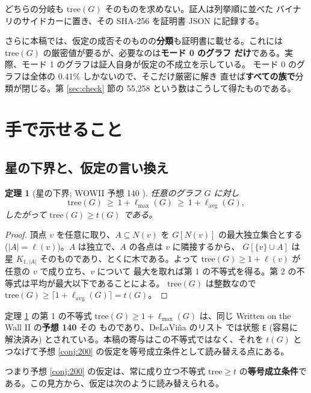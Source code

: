 \documentclass[paper=a4,fontsize=10.5pt,jafontsize=10.5pt]{jlreq}
\theoremstyle{plain}
\newtheorem{theorem}{定理}[section]
\theoremstyle{definition}
\begin{document}
どちらの分岐も $\mathrm{tree}(G)$ そのものを求めない。証人は列挙順に並べた
バイナリのサイドカーに置き、その SHA-256 を証明書 JSON に記録する。

さらに本稿では、仮定の成否そのものの\textbf{分類}も証明書に載せる。これには
$\mathrm{tree}(G)$ の厳密値が要るが、必要なのは\textbf{モード 0 のグラフ
だけ}である。実際、モード 1 のグラフは証人自身が仮定の不成立を示している。
モード 0 のグラフは全体の 0.41\% しかないので、そこだけ厳密に解き
直せば\textbf{すべての族で}分類が閉じる。第 \ref{sec:check} 節の
55,258 という数はこうして得たものである。

\section{手で示せること}\label{sec:hand}

\subsection{星の下界と、仮定の言い換え}

\begin{theorem}[星の下界; WOWII 予想 140 \cite{wowii}]\label{thm:star}
任意のグラフ $G$ に対し
\[ \mathrm{tree}(G) \ \ge \ 1 + \ell_{\max}(G)
   \ \ge \ 1 + \ell_{\mathrm{avg}}(G), \]
したがって $\mathrm{tree}(G) \ge t(G)$ である。
\end{theorem}

\begin{proof}
頂点 $v$ を任意に取り、$A \subseteq N(v)$ を $G[N(v)]$ の最大独立集合とする
($|A| = \ell(v)$)。$A$ は独立で、$A$ の各点は $v$ に隣接するから、
$G[\{v\} \cup A]$ は星 $K_{1,|A|}$ そのものであり、とくに木である。よって
$\mathrm{tree}(G) \ge 1 + \ell(v)$ が任意の $v$ で成り立ち、$v$ について
最大を取れば第 1 の不等式を得る。第 2 の不等式は平均が最大以下であることによる。
$\mathrm{tree}(G)$ は整数なので
$\mathrm{tree}(G) \ge \lceil 1 + \ell_{\mathrm{avg}}(G) \rceil = t(G)$。
\end{proof}

定理 \ref{thm:star} の第 1 の不等式 $\mathrm{tree}(G) \ge 1 +
\ell_{\max}(G)$ は、同じ Written on the Wall II の\textbf{予想 140} その
ものであり、DeLaViña のリスト \cite{wowii} では状態 \texttt{E} (容易に
解決済み) とされている。本稿の寄与はこの不等式ではなく、それを $t(G)$ と
つなげて予想 \ref{conj:200} の仮定を等号成立条件として読み替える点にある。

つまり予想 \ref{conj:200} の仮定は、常に成り立つ不等式 $\mathrm{tree} \ge t$
の\textbf{等号成立条件}である。この見方から、仮定は次のように読み替えられる。
\end{document}
